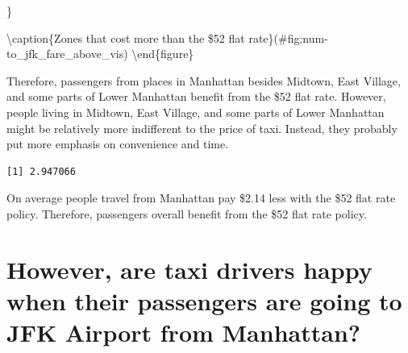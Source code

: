 \documentclass[12pt,twoside]{reedthesis}
\newenvironment{Shaded}{\begin{snugshade}}{\end{snugshade}}
\newcommand{\KeywordTok}[1]{\textcolor[rgb]{0.13,0.29,0.53}{\textbf{#1}}}
\newcommand{\OperatorTok}[1]{\textcolor[rgb]{0.81,0.36,0.00}{\textbf{#1}}}
\newcommand{\NormalTok}[1]{#1}
\theoremstyle{definition}
\theoremstyle{definition}
\theoremstyle{definition}
\theoremstyle{remark}
\begin{document}
\}

\textbackslash{}caption\{Zones that cost more than the \$52 flat
rate\}(\#fig:num-to\_jfk\_fare\_above\_vis)
\textbackslash{}end\{figure\}

Therefore, passengers from places in Manhattan besides Midtown, East
Village, and some parts of Lower Manhattan benefit from the \$52 flat
rate. However, people living in Midtown, East Village, and some parts of
Lower Manhattan might be relatively more indifferent to the price of
taxi. Instead, they probably put more emphasis on convenience and time.
\begin{Shaded}
\end{Shaded}
\begin{verbatim}
[1] 2.947066
\end{verbatim}
On average people travel from Manhattan pay \$2.14 less with the \$52
flat rate policy. Therefore, passengers overall benefit from the \$52
flat rate policy.

\section{However, are taxi drivers happy when their passengers are going
to JFK Airport from
Manhattan?}\label{however-are-taxi-drivers-happy-when-their-passengers-are-going-to-jfk-airport-from-manhattan}
\end{document}
